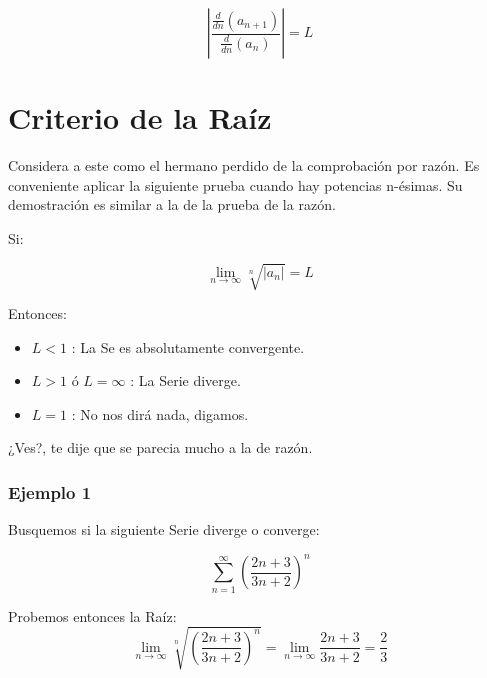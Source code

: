 \documentclass[12pt]{report}                                %
\begin{document}
        \begin{equation}
        \left| \frac{\frac{d}{dn} (a_{n+1})}{\frac{d}{dn} (a_n)} \right| = L
        \end{equation}



    \clearpage
    \section{Criterio de la Raíz}

        Considera a este como el hermano perdido de la comprobación por razón.
        Es conveniente aplicar la siguiente prueba cuando hay potencias n-ésimas.
        Su demostración es similar a la de la prueba de la razón. 

        Si:

        \begin{equation}
            \lim_{n \to \infty} \sqrt[n]{|a_n|} = L
        \end{equation}

        Entonces:
        \begin{itemize}
            \item $L < 1$ : La Se es absolutamente convergente.
            \item $L > 1$ ó $L = \infty$ : La Serie diverge.
            \item $L = 1$ : No nos dirá nada, digamos.
        \end{itemize}

        ¿Ves?, te dije que se parecia mucho a la de razón.

        \subsubsection{Ejemplo 1}
            Busquemos si la siguiente Serie diverge o converge:

            \begin{equation*}
                \sum_{n=1}^{\infty} \left( \frac{2n+3}{3n+2} \right)^n
            \end{equation*}

            Probemos entonces la Raíz:
            \begin{equation*}
                 \lim_{n \to \infty} \sqrt[n]{ \left( \frac{2n+3}{3n+2} \right)^n } =
                 \lim_{n \to \infty} \frac{2n+3}{3n+2} = \frac{2}{3}
            \end{equation*}
\end{document}
